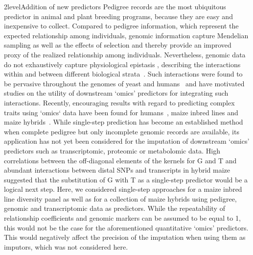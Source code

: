 \documentclass[12pt,titlepage]{article}
\begin{document}
\Genetics2level{Addition of new predictors}
Pedigree records are the most ubiquitous predictor in animal and plant breeding
programs, because they are easy and inexpensive to collect.
Compared to pedigree information, which represent the expected relationship
among individuals, genomic information capture Mendelian sampling as well as the
effects of selection and thereby provide an improved proxy of the realized
relationship among individuals.
Nevertheless, genomic data do not exhaustively capture physiological epistasis 
\cite{Jiang2015,Guo2016,Vazquez2016}, describing the interactions 
within and between different biological strata~\cite{Sackton2016}.
Such interactions were found to be pervasive throughout the genomes of yeast 
\cite{Brem2005} and humans~\cite{Brown2014} and have motivated studies on the 
utility of downstream `omics' predictors for integrating such interactions.
Recently, encouraging results with regard to predicting complex traits using
`omics` data have been found for humans~\cite{Vazquez2016}, maize inbred lines
\cite{Guo2016} and maize hybrids~\cite{Westhues2017}.
While single-step prediction has become an established method when complete
pedigree but only incomplete genomic records are available, its application has
not yet been considered for the imputation of downstream `omics' predictors
such as transcriptomic, proteomic or metabolomic data.
High correlations between the off-diagonal elements of the kernels for G and T
and abundant interactions between distal SNPs and transcripts in hybrid maize
\cite{Westhues2017} suggested that the substitution of G with T as a single-step
predictor would be a logical next step.
Here, we considered single-step approaches for a maize inbred line diversity
panel as well as for a collection of maize hybrids using pedigree, genomic and
transcriptomic data as predictors.
While the repeatability of relationship coefficients and genomic markers can be
assumed to be equal to 1, this would not be the case for the aforementioned
quantitative `omics' predictors. 
This would negatively affect the precision of the imputation when using them as
imputors, which was not considered here.
\end{document}
